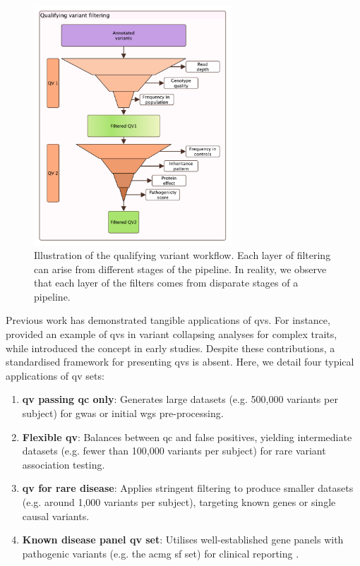 \begin{figure}
\centering
     \includegraphics[width=0.66\textwidth]{./images/qv_filter_pyramid_vcurrent.pdf}
\caption{Illustration of the qualifying variant workflow. Each layer of filtering can arise from different stages of the pipeline. In reality, we observe that each layer of the filters comes from disparate stages of a pipeline.}
    \label{fig:qv_filter_pyramid_vcurrent}
\end{figure}

Previous work has demonstrated tangible applications of \ac{qv}s. For instance, \citet{povysil2019rare} provided an example of \ac{qv}s in variant collapsing analyses for complex traits, while \citet{cirulli2015exome} introduced the concept in early studies. Despite these contributions, a standardised framework for presenting \ac{qv}s is absent. Here, we detail four typical applications of \ac{qv} sets:
\begin{enumerate}
    \item \textbf{\ac{qv} passing \ac{qc} only}: Generates large datasets (e.g. 500,000 variants per subject) for \ac{gwas} or initial \ac{wgs} pre-processing.
    \item \textbf{Flexible \ac{qv}}: Balances between \ac{qc} and false positives, yielding intermediate datasets (e.g. fewer than 100,000 variants per subject) for rare variant association testing.
    \item \textbf{\ac{qv} for rare disease}: Applies stringent filtering to produce smaller datasets (e.g. around 1,000 variants per subject), targeting known genes or single causal variants.
    \item \textbf{Known disease panel \ac{qv} set}: Utilises well-established gene panels with pathogenic variants (e.g. the \ac{acmg} \ac{sf} set) for clinical reporting \cite{miller2023acmg}.
\end{enumerate}

